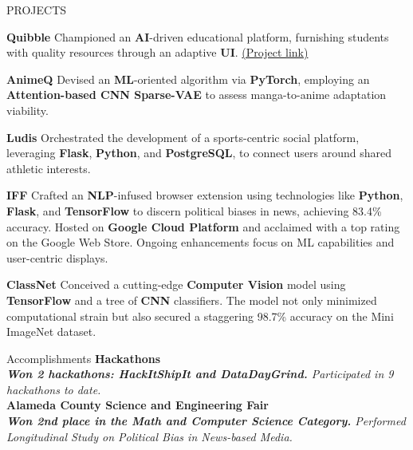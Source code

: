 \documentclass{resume} %
\begin{document}
\begin{rSection}{PROJECTS}
\vspace{-1em}

\item \textbf{Quibble} {Championed an \textbf{AI}-driven educational platform, furnishing students with quality resources through an adaptive \textbf{UI}.} \href{https://quibble.webflow.io/}{(Project link)}
\vspace{-1.75mm}

\item \textbf{AnimeQ} {Devised an \textbf{ML}-oriented algorithm via \textbf{PyTorch}, employing an \textbf{Attention-based CNN Sparse-VAE} to assess manga-to-anime adaptation viability.}
\vspace{-1.75mm}

\item \textbf{Ludis} {Orchestrated the development of a sports-centric social platform, leveraging \textbf{Flask}, \textbf{Python}, and \textbf{PostgreSQL}, to connect users around shared athletic interests.}
\vspace{-1.75mm}

\item \textbf{IFF} {Crafted an \textbf{NLP}-infused browser extension using technologies like \textbf{Python}, \textbf{Flask}, and \textbf{TensorFlow} to discern political biases in news, achieving 83.4\% accuracy. Hosted on \textbf{Google Cloud Platform} and acclaimed with a top rating on the Google Web Store. Ongoing enhancements focus on ML capabilities and user-centric displays.}
\vspace{-1.75mm}

\item \textbf{ClassNet} {Conceived a cutting-edge \textbf{Computer Vision} model using \textbf{TensorFlow} and a tree of \textbf{CNN} classifiers. The model not only minimized computational strain but also secured a staggering 98.7\% accuracy on the Mini ImageNet dataset.}
\end{rSection} 


\begin{rSection}{Accomplishments} 
\textbf{Hackathons}\\
\textit{\textbf{Won 2 hackathons: HackItShipIt and DataDayGrind.} Participated in 9 hackathons to date. } \\
\textbf{Alameda County Science and Engineering Fair}\\
\textit{\textbf{Won 2nd place in the Math and Computer Science Category.} Performed Longitudinal Study on Political Bias in News-based Media.}

\end{rSection}
\end{document}
